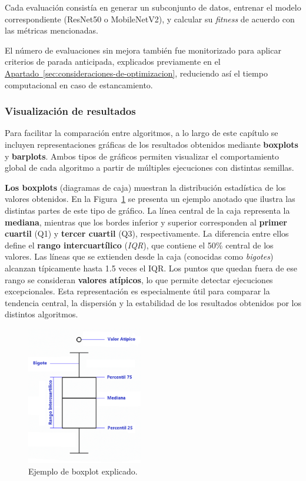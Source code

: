 Cada evaluación consistía en generar un subconjunto de datos, entrenar el modelo correspondiente (ResNet50 o MobileNetV2),
y calcular su \textit{fitness} de acuerdo con las métricas mencionadas.

El número de evaluaciones sin mejora también fue monitorizado para aplicar criterios de parada anticipada,
explicados previamente en el \hyperref[sec:consideraciones-de-optimizacion]{Apartado~\ref*{sec:consideraciones-de-optimizacion}},
reduciendo así el tiempo computacional en caso de estancamiento.

\subsubsection{Visualización de resultados}\label{subsec:visualizacion-de-resultados}
Para facilitar la comparación entre algoritmos, a lo largo de este capítulo se incluyen representaciones gráficas de los resultados obtenidos mediante \textbf{boxplots} y \textbf{barplots}.
Ambos tipos de gráficos permiten visualizar el comportamiento global de cada algoritmo a partir de múltiples ejecuciones con distintas semillas.

\textbf{Los boxplots} (diagramas de caja) muestran la distribución estadística de los valores obtenidos.
En la Figura~\ref{fig:boxplot-explicado} se presenta un ejemplo anotado que ilustra las distintas partes de este tipo de gráfico.
La línea central de la caja representa la \textbf{mediana},
mientras que los bordes inferior y superior corresponden al \textbf{primer cuartil} (Q1) y \textbf{tercer cuartil} (Q3), respectivamente.
La diferencia entre ellos define el \textbf{rango intercuartílico} (\textit{IQR}), que contiene el 50\% central de los valores.
Las líneas que se extienden desde la caja (conocidas como \textit{bigotes}) alcanzan típicamente hasta 1.5 veces el IQR.
Los puntos que quedan fuera de ese rango se consideran \textbf{valores atípicos}, lo que permite detectar ejecuciones excepcionales.
Esta representación es especialmente útil para comparar la tendencia central, la dispersión y la estabilidad de los resultados obtenidos por los distintos algoritmos.

\begin{figure}[H]
    \centering
    \includegraphics[width=0.45\textwidth]{imagenes/boxplot-explicado}
    \caption{Ejemplo de boxplot explicado.}
    \label{fig:boxplot-explicado}
\end{figure}

